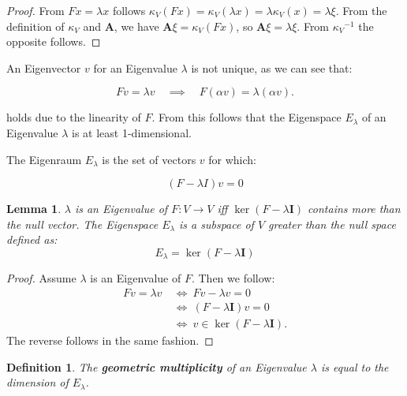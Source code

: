 \documentclass[a4paper,12pt]{article}
\newcommand{\I}{\mat{I}}
\newcommand{\A}{\mat{A}}
\newcommand{\Er}{E_{\lambda}}
\newcommand{\mat}[1]{\mathbf{#1}}
\newcommand{\inv}[1]{{#1}^{-1}}
\let\oldxi\xi
\renewcommand{\xi}{\mathbb{\oldxi}}
\theoremstyle{plain}
\newtheorem{defn}{Definition}[section]
\newtheorem{lemma}{Lemma}[section]
\numberwithin{equation}{section}
\begin{document}
\begin{proof}
    From $F x = \lambda x$ follows $\kappa_{V}(F x) = \kappa_{V}(\lambda x) =
    \lambda \kappa_{V}(x) = \lambda \xi$. From the definition of $\kappa_{V}$ and
    $\A$, we have $\A \xi = \kappa_{V}(F x)$, so $\A \xi = \lambda \xi$.
    From $\inv{\kappa_{V}}$ the opposite follows.
\end{proof}

An Eigenvector $v$ for an Eigenvalue $\lambda$ is not unique, as we can see that:

\begin{equation*}
    F v = \lambda v \quad \implies \quad F (\alpha v) = \lambda (\alpha v).
\end{equation*}

holds due to the linearity of $F$. From this follows that the Eigenspace $\Er$
of an Eigenvalue $\lambda$ is at least 1-dimensional.

The Eigenraum $\Er$ is the set of vectors $v$ for which:

\begin{equation}
    (F - \lambda I) v = 0
\end{equation}

\begin{lemma}
\label{lem:ev-kern}
    $\lambda$ is an Eigenvalue of $F \colon V \rightarrow V$ iff $\ker (F - \lambda \I)$
    contains more than the null vector. The Eigenspace $\Er$ is a
    subspace of $V$ greater than the null space defined as:
    \begin{equation}
        \Er = \ker (F - \lambda \I)
    \end{equation}
\end{lemma}

\begin{proof}
    Assume $\lambda$ is an Eigenvalue of $F$. Then we follow:
    \begin{align*}
        F v = \lambda v \ &\iff \ F v - \lambda v = 0 \\
        &\iff \ (F - \lambda \I) v = 0 \\
        &\iff \ v \in \ker (F - \lambda \I).
    \end{align*}
    The reverse follows in the same fashion.
\end{proof}

\begin{defn}
\label{geo-mult}
    The \textbf{geometric multiplicity} of an Eigenvalue $\lambda$ is equal to
    the dimension of $\Er$.
\end{defn}
\end{document}
